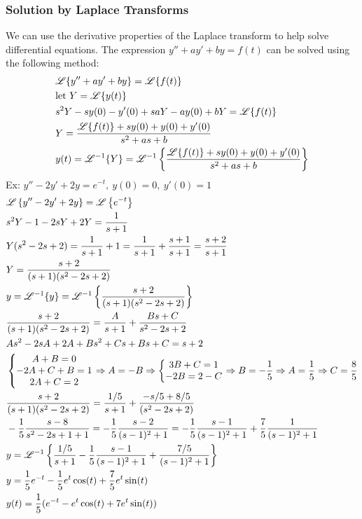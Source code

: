 \documentclass[11pt, fleqn]{article}
\begin{document}
\subsubsection{Solution by Laplace Transforms}
We can use the derivative properties of the Laplace transform to help solve differential equations. The expression $y''+ay'+by=f(t)$ can be solved using the following method:
\begin{align*}
    &\mathscr{L}\{y''+ay'+by\}=\mathscr{L}\{f(t)\}\\
    &\text{let }Y=\mathscr{L}\{y(t)\}\\
    &s^2Y-sy(0)-y'(0)+saY-ay(0)+bY=\mathscr{L}\{f(t)\}\\
    &Y=\frac{\mathscr{L}\{f(t)\}+sy(0)+y(0)+y'(0)}{s^2+as+b}\\
    &y(t)=\mathscr{L}^{-1}\{Y\}=\mathscr{L}^{-1}\left\{\frac{\mathscr{L}\{f(t)\}+sy(0)+y(0)+y'(0)}{s^2+as+b}\right\}
\end{align*}
Ex: $y''-2y'+2y=e^{-t},\ y(0)=0,\ y'(0)=1$
\begin{align*}
    &\mathscr{L}\left\{ y''-2y'+2y \right\}=\mathscr{L}\left\{ e^{-t} \right\}\\
    &s^2Y-1-2sY+2Y=\frac{1}{s+1}\\
    &Y(s^2-2s+2)=\frac{1}{s+1}+1=\frac{1}{s+1}+\frac{s+1}{s+1}=\frac{s+2}{s+1}\\
    &Y=\frac{s+2}{(s+1)(s^2-2s+2)}\\
    &y=\mathscr{L}^{-1}\{y\}=\mathscr{L}^{-1}\left\{ \frac{s+2}{(s+1)(s^2-2s+2)} \right\}\\
    &\frac{s+2}{(s+1)(s^2-2s+2)}=\frac{A}{s+1}+\frac{Bs+C}{s^2-2s+2}\\
    &As^2-2sA+2A+Bs^2+Cs+Bs+C=s+2\\
    &\left\{\begin{matrix} A+B=0\\-2A+C+B=1\\2A+C=2 \end{matrix}\right.\Rightarrow A=-B\Rightarrow \left\{\begin{matrix} 3B+C=1\\-2B=2-C \end{matrix}\right.\Rightarrow B=-\frac{1}{5}\Rightarrow A=\frac{1}{5}\Rightarrow C=\frac{8}{5}\\
    &\frac{s+2}{(s+1)(s^2-2s+2)}=\frac{1/5}{s+1}+\frac{-s/5+8/5}{(s^2-2s+2)}\\
    &-\frac{1}{5}\frac{s-8}{s^2-2s+1+1}=-\frac{1}{5}\frac{s-2}{(s-1)^2+1}=-\frac{1}{5}\frac{s-1}{(s-1)^2+1}+\frac{7}{5}\frac{1}{(s-1)^2+1}\\
    &y=\mathscr{L}^{-1}\left\{ \frac{1/5}{s+1}-\frac{1}{5}\frac{s-1}{(s-1)^2+1}+\frac{7/5}{(s-1)^2+1} \right\}\\
    &y=\frac{1}{5}e^{-t}-\frac{1}{5}e^t\cos(t)+\frac{7}{5}e^t\sin(t)\\
    &y(t)=\frac{1}{5}(e^{-t}-e^t\cos(t)+7e^t\sin(t))
\end{align*}
\end{document}

